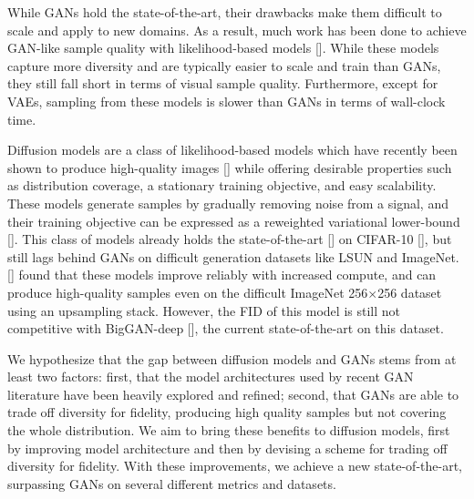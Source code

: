 While GANs hold the state-of-the-art, their drawbacks make them difficult to scale and apply to new domains. As a result, much work has been done to achieve GAN-like sample quality with likelihood-based models []. While these models capture more diversity and are typically easier to scale and train than GANs, they still fall short in terms of visual sample quality. Furthermore, except for VAEs, sampling from these models is slower than GANs in terms of wall-clock time.

Diffusion models are a class of likelihood-based models which have recently been shown to produce high-quality images [] while offering desirable properties such as distribution coverage, a stationary training objective, and easy scalability. These models generate samples by gradually removing noise from a signal, and their training objective can be expressed as a reweighted variational lower-bound []. This class of models already holds the state-of-the-art [] on CIFAR-10 [], but still lags behind GANs on difficult generation datasets like LSUN and ImageNet. \citeauthor{improved} [] found that these models improve reliably with increased compute, and can produce high-quality samples even on the difficult ImageNet 256$\times$256 dataset using an upsampling stack. However, the FID of this model is still not competitive with BigGAN-deep [], the current state-of-the-art on this dataset.

We hypothesize that the gap between diffusion models and GANs stems from at least two factors: first, that the model architectures used by recent GAN literature have been heavily explored and refined; second, that GANs are able to trade off diversity for fidelity, producing high quality samples but not covering the whole distribution. We aim to bring these benefits to diffusion models, first by improving model architecture and then by devising a scheme for trading off diversity for fidelity. With these improvements, we achieve a new state-of-the-art, surpassing GANs on several different metrics and datasets.

